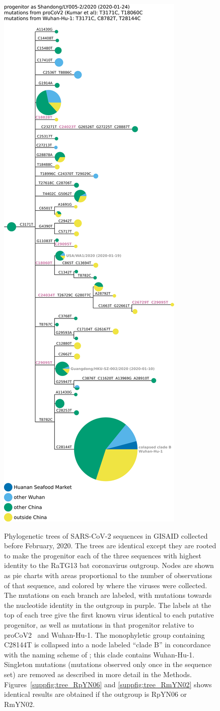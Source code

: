 \documentclass[9pt,twocolumn,twoside]{gsajnl_modified}
\begin{document}
\begin{figure}
{  \hspace{0.02\linewidth}
 \includegraphics[width=0.31\linewidth, valign=t, clip=true, trim=0in 4.4in 0in 0in]{figures/tree_images/hCoV-19-Shandong-LY005-2-2020_RaTG13_without_deleted_seqs.pdf}
 }
 \caption{
 Phylogenetic trees of SARS-CoV-2 sequences in GISAID collected before February, 2020.
 The trees are identical except they are rooted to make the progenitor each of the three sequences with highest identity to the RaTG13 bat coronavirus outgroup.
Nodes are shown as pie charts with areas proportional to the number of observations of that sequence, and colored by where the viruses were collected.
The mutations on each branch are labeled, with mutations towards the nucleotide identity in the outgroup in purple.
The labels at the top of each tree give the first known virus identical to each putative progenitor, as well as mutations in that progenitor relative to proCoV2~\citep{kumar2021evolutionary} and Wuhan-Hu-1.
The monophyletic group containing C28144T is collapsed into a node labeled ``clade B'' in concordance with the naming scheme of \citet{rambaut2020dynamic}; this clade contains Wuhan-Hu-1.
Singleton mutations (mutations observed only once in the sequence set) are removed as described in more detail in the Methods.
 Figures~\ref{suppfig:tree_RpYN06} and \ref{suppfig:tree_RmYN02} shows identical results are obtained if the outgroup is RpYN06 or RmYN02.
\label{fig:tree_RaTG13}
 }
 \end{figure}
\end{document}
